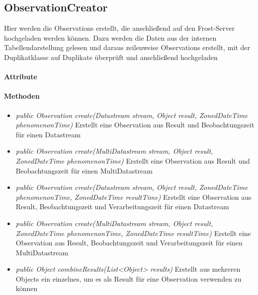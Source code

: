
\subsection{ObservationCreator}


Hier werden die Observations erstellt, die anschließend auf den Frost-Server hochgeladen werden können.
Dazu werden die Daten aus der internen Tabellendarstellung gelesen und daraus zeilenweise Observations erstellt, mit der Duplikatklasse auf Duplikate überprüft und anschließend hochgeladen

\paragraph{Attribute}
\paragraph{Methoden}

\begin{itemize}
\item \textit{public Observation create(Datastream stream, Object result, ZonedDateTime phenomenonTime)} Erstellt eine Observation aus Result und Beobachtungszeit für einen Datastream
\item \textit{public Observation create(MultiDatastream stream, Object result, ZonedDateTime phenomenonTime)} Erstellt eine Observation aus Result und Beobachtungszeit für einen MultiDatastream
\item \textit{public Observation create(Datastream stream, Object result, ZonedDateTime phenomenonTime, ZonedDateTime resultTime)} Erstellt eine Observation aus Result, Beobachtungszeit und Verarbeitungszeit für einen Datastream
\item \textit{public Observation create(MultiDatastream stream, Object result, ZonedDateTime phenomenonTime, ZonedDateTime resultTime)} Erstellt eine Observation aus Result, Beobachtungszeit und Verarbeitungszeit für einen MultiDatastream
\item \textit{public Object combineResults(List<Object> results)} Erstellt aus mehreren Objects ein einzelnes, um es als Result für eine Observation verwenden zu können
\end{itemize}